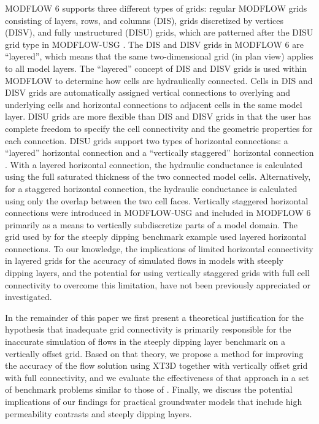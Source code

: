 \documentclass{article}
\begin{document}
MODFLOW 6 supports three different types of grids: regular MODFLOW grids consisting of layers, rows, and columns (DIS),  grids discretized by vertices (DISV), and fully unstructured (DISU) grids, which are patterned after the DISU grid type in MODFLOW-USG  \citep{modflowusg}.  The DIS and DISV grids in MODFLOW 6 are ``layered'', which means that the same two-dimensional grid (in plan view) applies to all model layers.  The ``layered'' concept of DIS and DISV grids is used within MODFLOW to determine how cells are hydraulically connected.  Cells in DIS and DISV grids are automatically assigned vertical connections to overlying and underlying cells and horizontal connections to adjacent cells in the same model layer.  DISU grids are more flexible than DIS and DISV grids in that the user has complete freedom to specify the cell connectivity and the geometric properties for each connection.  DISU grids support two types of horizontal connections: a ``layered'' horizontal connection and a ``vertically staggered'' horizontal connection \citep{modflow6gwf}.  With a layered horizontal connection, the hydraulic conductance is calculated using the full saturated thickness of the two connected model cells.  Alternatively, for a staggered horizontal connection, the hydraulic conductance is calculated using only the overlap between the two cell faces. Vertically staggered horizontal connections were introduced in MODFLOW-USG \citep{modflowusg} and included in MODFLOW 6 \citep{modflow6gwf} primarily as a means to vertically subdiscretize parts of a model domain.  The grid used by \cite{bardot2022} for the steeply dipping benchmark example used layered horizontal connections.  To our knowledge, the implications of limited horizontal connectivity in layered grids for the accuracy of simulated flows in models with steeply dipping layers, and the potential for using vertically staggered grids with full cell connectivity to overcome this limitation, have not been previously appreciated or investigated.


In the remainder of this paper we first present a theoretical justification for the hypothesis that inadequate grid connectivity is primarily responsible for the inaccurate simulation of flows in the steeply dipping layer benchmark on a vertically offset grid. Based on that theory, we propose a method for improving the accuracy of the flow solution using XT3D together with vertically offset grid with full connectivity, and we evaluate the effectiveness of that approach in a set of benchmark problems similar to those of \cite{bardot2022}. Finally, we discuss the potential implications of our findings for practical groundwater models that include high permeability contrasts and steeply dipping layers.
\end{document}
